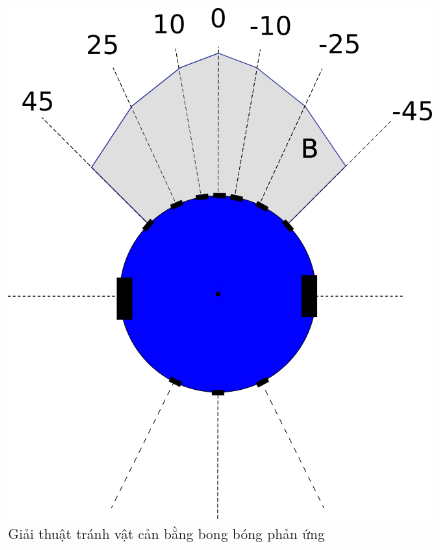 \begin{figure}[htbp]
    \centering
    \includegraphics[width=0.6\linewidth]{figures/BB-argorithm.png}
    \caption{Giải thuật tránh vật cản bằng bong bóng phản ứng}
    \label{fig:BB-argorithm}
\end{figure}

